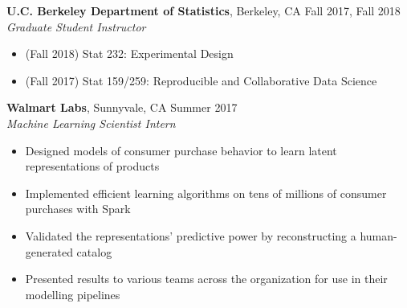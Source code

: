 \documentclass{res}
\begin{document}
\begin{resume}
\textbf{U.C. Berkeley Department of Statistics}, Berkeley, CA  \hfill{Fall 2017, Fall 2018}\\
\textit{Graduate Student Instructor}
\begin{itemize}
\item (Fall 2018) Stat 232: Experimental Design  
\item (Fall 2017) Stat 159/259: Reproducible and Collaborative Data Science
\end{itemize}  
\vspace{-2mm}  
\textbf{Walmart Labs}, Sunnyvale, CA \hfill{Summer 2017}\\
\textit{Machine Learning Scientist Intern}
\begin{itemize}
\item Designed models of consumer purchase behavior to learn latent representations of products
\item Implemented efficient learning algorithms on tens of millions of consumer purchases with Spark
\item Validated the representations' predictive power by reconstructing a human-generated catalog
\item Presented results to various teams across the organization for use in their modelling pipelines
\end{itemize}



\end{resume}
\end{document}

